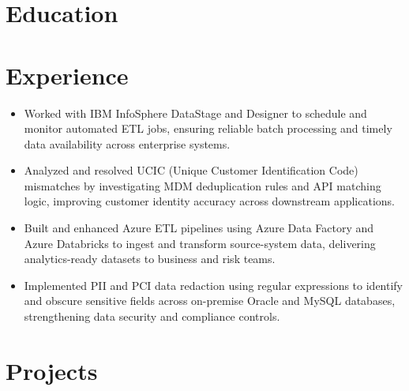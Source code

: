 \documentclass{resume}
\begin{document}

\section{Education}
\begin{itemize}
\end{itemize}

\section{Experience}
\begin{itemize}
  \item Worked with IBM InfoSphere DataStage and Designer to schedule and monitor automated ETL jobs, ensuring reliable batch processing and timely data availability across enterprise systems.
  \item Analyzed and resolved UCIC (Unique Customer Identification Code) mismatches by investigating MDM deduplication rules and API matching logic, improving customer identity accuracy across downstream applications.
  \item Built and enhanced Azure ETL pipelines using Azure Data Factory and Azure Databricks to ingest and transform source-system data, delivering analytics-ready datasets to business and risk teams.
  \item Implemented PII and PCI data redaction using regular expressions to identify and obscure sensitive fields across on-premise Oracle and MySQL databases, strengthening data security and compliance controls.
\end{itemize}

\section{Projects}
\end{document}
